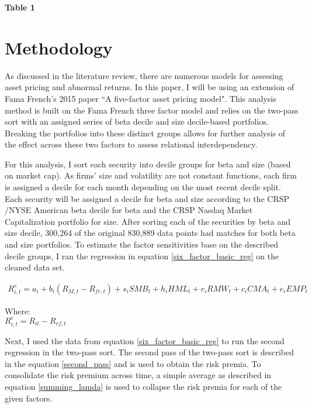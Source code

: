 \documentclass[12pt,oneside,reqno]{amsart}
\begin{document}
 
 \begin{center}
     \textbf{Table 1}\\
 
 \end{center}
 
\section{Methodology}
\label{Methodology}
As discussed in the literature review, there are numerous models for assessing asset pricing and abnormal returns. In this paper, I will be using an extension of Fama French's 2015 paper ``A five-factor asset pricing model". This analysis method is built on the Fama French three factor model and relies on the two-pass sort with an assigned series of beta decile and size decile-based portfolios. Breaking the portfolios into these distinct groups allows for further analysis of the effect across these two factors to assess relational interdependency. 

For this analysis, I sort each security into decile groups for beta and size (based on market cap). As firms' size and volatility are not constant functions, each firm is assigned a decile for each month depending on the most recent decile split.  Each security will be assigned a decile for beta and size according to the CRSP /NYSE American beta decile for beta and the CRSP Nasdaq Market Capitalization portfolio for size. After sorting each of the securities by beta and size decile, 300,264 of the original 830,889 data points had matches for both beta and size portfolios. To estimate the factor sensitivities base on the described decile groups, I ran the regression in equation \eqref{six_factor_basic_reg} on the cleaned data set. 




\begin{equation}
\begin{split}
    R_{i,t}^e = a_i+b_i(R_{M,t}-R_{fr,t})+s_iSMB_t+ h_iHML_t+  r_iRMW_t+c_iCMA_t+e_iEMP_t
    \end{split}
    \label{six_factor_basic_reg}
\end{equation}

\begin{center}
Where:\\
    $R_{i,t}^e = R_{it}-R_{rf,t}$
\end{center}

Next, I used the data from equation \eqref{six_factor_basic_reg} to run the second regression in the two-pass sort. The second pass of the two-pass sort is described in the equation  \eqref{second_pass} and is used to obtain the risk premia. To consolidate the risk premium across time, a simple average as described in equation \eqref{summing_lamda} is used to collapse the risk premia for each of the given factors. 
\end{document}
